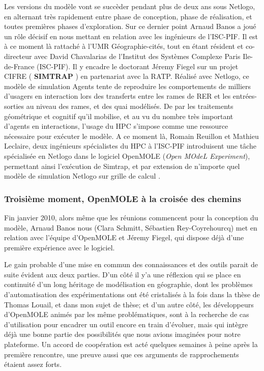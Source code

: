 Les versions du modèle vont se succèder pendant plus de deux ans sous Netlogo, en alternant très rapidement entre phase de conception, phase de réalisation, et toutes premières phases d'exploration. Sur ce dernier point Arnaud Banos a joué un rôle décisif en nous mettant en relation avec les ingénieurs de l'ISC-PIF. Il est à ce moment là rattaché à l'UMR Géographie-cités, tout en étant résident et co-directeur avec David Chavalarias de l'Institut des Systèmes Complexe Paris Ile-de-France (ISC-PIF). Il y encadre le doctorant Jéremy Fiegel sur un projet CIFRE ( \textbf{SIMTRAP} ) en partenariat avec la RATP. Réalisé avec Netlogo, ce modèle de simulation Agents tente de reproduire les comportements de milliers d'usagers en interaction lors des transferts entre les rames de RER et les entrées-sorties au niveau des rames, et des quai modélisés. De par les traitements géométrique et cognitif qu'il mobilise, et au vu du nombre très important d'agents en interactions, l'usage du HPC s'impose comme une ressource nécessaire pour exécuter le modèle. A ce moment là, Romain Reuillon et Mathieu Leclaire, deux ingénieurs spécialistes du HPC à l'ISC-PIF introduisent une tâche spécialisée en Netlogo dans le logiciel OpenMOLE (\textit{Open MOdeL Experiment}), permettant ainsi l'exécution de Simtrap, et par extension de n'importe quel modèle de simulation Netlogo sur grille de calcul \autocite[53]{Banos2013}.

\subsubsection{Troisième moment, OpenMOLE à la croisée des chemins}
\label{sssec:troisieme_moment}

Fin janvier 2010, alors même que les réunions commencent pour la conception du modèle, Arnaud Banos nous (Clara Schmitt, Sébastien Rey-Coyrehourcq) met en relation avec l'équipe d'OpenMOLE et Jéremy Fiegel, qui dispose déjà d'une première expérience avec le logiciel.

Le gain probable d'une mise en commun des connaissances et des outils parait de suite évident aux deux parties. D'un côté il y'a une réflexion qui se place en continuité d'un long héritage de modélisation en géographie, dont les problèmes d'automatisation des expérimentations ont été cristalisés à la fois dans la thèse de Thomas Louail, et dans mon sujet de thèse; et d'un autre côté, les développeurs d'OpenMOLE animés par les même problématiques, sont à la recherche de cas d'utilisation pour encadrer un outil encore en train d'évoluer, mais qui intègre déjà une bonne partie des possibilités que nous avions imaginées pour notre plateforme. Un accord de coopération est acté quelques semaines à peine après la première rencontre, une preuve aussi que ces arguments de rapprochements étaient assez forts.

